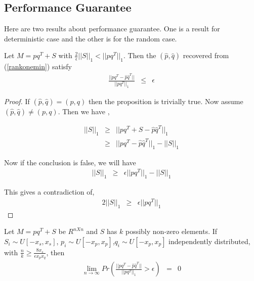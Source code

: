 \documentclass{../common/projectreport}
\begin{document}
\subsection{Performance Guarantee}

Here are two results about performance guarantee. One is a result for deterministic case and the other is for the random case. 
\begin{prop}
Let $M=pq^{T}+S$ with $\frac{2}{\epsilon}||S||_{1}<||pq^{T}||_{1}$. Then the $(\hat{p},\hat{q})$ recovered from (\ref{rankonemin})
satisfy 
\begin{eqnarray*}
\frac{||pq^{T}-\hat{p}\hat{q}^{T}||}{||pq^{T}||_{1}} & \le & \epsilon
\end{eqnarray*}
\end{prop}
\begin{proof}
If $(\hat{p},\hat{q})=(p,q)$ then the proposition is trivially true.
Now assume $(\hat{p},\hat{q})\not=(p,q)$. Then we have ,

\begin{eqnarray*}
||S||_{1} & \ge & ||pq^{T}+S-\hat{p}\hat{q}^{T}||_{1}\\
 & \ge & ||pq^{T}-\hat{p}\hat{q}^{T}||_{1}-||S||_{1}
\end{eqnarray*}


Now if the conclusion is false, we will have 
\begin{eqnarray*}
||S||_{1} & \ge & \epsilon||pq^{T}||_{1}-||S||_{1}
\end{eqnarray*}


This gives a contradiction of, 
\begin{eqnarray*}
2||S||_{1} & \ge & \epsilon||pq^{T}||_{1}
\end{eqnarray*}
\end{proof}
\begin{prop}
Let $M=pq^{T}+S$ be $R^{nXn}$ and $S$ has $k$ possibly non-zero
elements. If $S_{i}\sim U[-x_{s},x_{s}]$, $p_{i}\sim U[-x_{p},x_{p}]$,$q_{i}\sim U[-x_{p},x_{p}]$
independently distributed, with $\frac{n}{k}\ge\frac{8x_{s}}{\epsilon x_{p}x_{q}}$,
then 
\begin{eqnarray*}
\lim_{n\to\infty}Pr(\frac{||pq^{T}-\hat{p}\hat{q}^{T}||}{||pq^{T}||_{1}}>\epsilon) & = & 0
\end{eqnarray*}
\end{prop}
\end{document}
